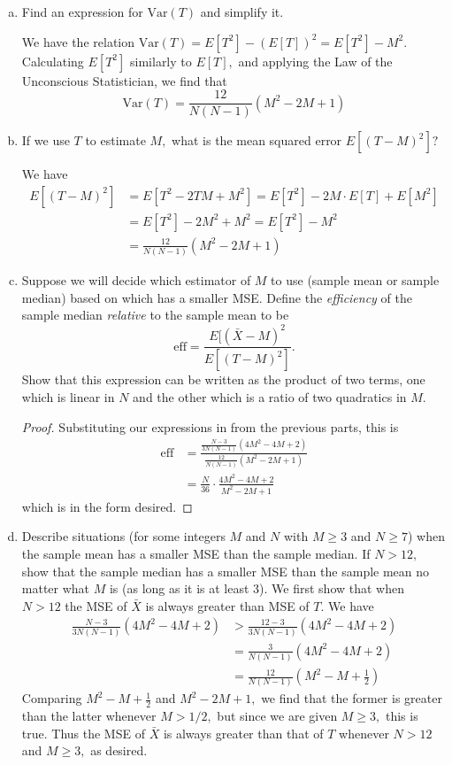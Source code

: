 \documentclass{article}
\newcommand{\var}{\mathrm{Var}}
\begin{document}
\begin{enumerate}
\begin{enumerate}[(a)]
			\item Find an expression for $\var(T)$ and simplify it.
				\begin{soln}
					We have the relation $\var(T)=E[T^2]-(E[T])^2=E[T^2]-M^2.$ Calculating $E[T^2]$ similarly to $E[T],$ and applying the Law of the Unconscious Statistician, we find that \[\var(T)=\boxed{\frac{12}{N(N-1)}(M^2-2M+1)}\]
				\end{soln}

			\item If we use $T$ to estimate $M,$ what is the mean squared error $E[(T-M)^2]?$
				\begin{soln}
					We have 
					\begin{align*}
						E[(T-M)^2]&=E[T^2-2TM+M^2]=E[T^2]-2M\cdot E[T]+E[M^2] \\
						&=E[T^2]-2M^2+M^2=E[T^2]-M^2 \\
						&= \boxed{\frac{12}{N(N-1)}(M^2-2M+1)}
					\end{align*}			
				\end{soln}

			\item Suppose we will decide which estimator of $M$ to use (sample mean or sample median) based on which has a smaller MSE. Define the \textit{efficiency} of the sample median \textit{relative} to the sample mean to be \[\text{eff}=\frac{E[(\bar{X}-M)^2}{E[(T-M)^2]}.\] Show that this expression can be written as the product of two terms, one which is linear in $N$ and the other which is a ratio of two quadratics in $M.$
				\begin{proof}
					Substituting our expressions in from the previous parts, this is
					\begin{align*}
						\text{eff} &= \frac{\frac{N-3}{3N(N-1)}(4M^2-4M+2)}{\frac{12}{N(N-1)}(M^2-2M+1)} \\
						&= \frac{N}{36} \cdot \frac{4M^2-4M+2}{M^2-2M+1}
					\end{align*} which is in the form desired.

				\end{proof}

				\newpage
			\item Describe situations (for some integers $M$ and $N$ with $M\ge3$ and $N\ge7$) when the sample mean has a smaller MSE than the sample median. If $N>12,$ show that the sample median has a smaller MSE than the sample mean no matter what $M$ is (as long as it is at least 3).
				We first show that when $N>12$ the MSE of $\bar{X}$ is always greater than MSE of $T.$ We have 
				\begin{align*}
					\frac{N-3}{3N(N-1)}(4M^2-4M+2) &> \frac{12-3}{3N(N-1)}(4M^2-4M+2) \\
					&= \frac{3}{N(N-1)}(4M^2-4M+2)\\
					&= \frac{12}{N(N-1)}\left( M^2-M+\frac{1}{2} \right)
				\end{align*} 
				Comparing $M^2-M+\frac{1}{2}$ and $M^2-2M+1,$ we find that the former is greater than the latter whenever $M>1/2,$ but since we are given $M\ge 3,$ this is true. Thus the MSE of $\bar{X}$ is always greater than that of $T$ whenever $N>12$ and $M\ge 3,$ as desired.


\end{enumerate}
\end{enumerate}
\end{document}
